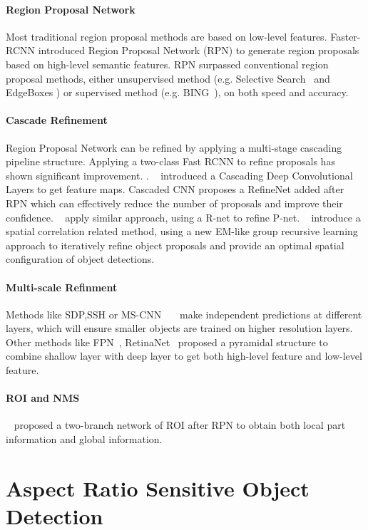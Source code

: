 \documentclass[10pt,twocolumn,letterpaper]{article}
\begin{document}
\paragraph{Region Proposal Network}
Most traditional region proposal methods are based on low-level features. Faster-RCNN introduced Region Proposal Network (RPN) to generate region proposals based on high-level semantic features. RPN surpassed conventional region proposal methods, either unsupervised method (e.g. Selective Search~\cite{SelectiveSearch} and EdgeBoxes \cite{EdgeBoxes}) or supervised method (e.g. BING~\cite{BING}), on both speed and accuracy.
\paragraph{Cascade Refinement}
Region Proposal Network can be refined by applying a multi-stage cascading pipeline structure. Applying a two-class Fast RCNN to refine proposals has shown significant improvement. \cite{CRAFT} \cite{CraftingGBD} \cite{DeepBox}.  ~\citet{DeepProposal} introduced a Cascading Deep Convolutional Layers to get feature maps. Cascaded CNN \cite{Cascadedcnn} proposes a RefineNet added after RPN which can effectively reduce the number of proposals and improve their confidence. ~\citet{MTCNN} apply similar approach, using a R-net to refine P-net. ~\citet{GroupRecursive} introduce a spatial correlation related method, using a new EM-like group recursive learning approach to iteratively refine object proposals and provide an optimal spatial configuration of object detections.
\paragraph{Multi-scale Refinment}
Methods like SDP,SSH or MS-CNN ~\cite{SDP}~\cite{SSH}~\cite{MSCNN}make independent predictions at different layers, which will ensure smaller objects are trained on higher resolution layers. Other methods like FPN~\cite{FPN}, RetinaNet~\cite{RetinaNet} proposed a pyramidal structure to combine shallow layer with deep layer to get both high-level feature and low-level feature.
\paragraph{ROI and NMS}
~\citet{CoupleNet} proposed a two-branch network of ROI after RPN to obtain both local part information and global information.

\section{Aspect Ratio Sensitive Object Detection}
\end{document}
